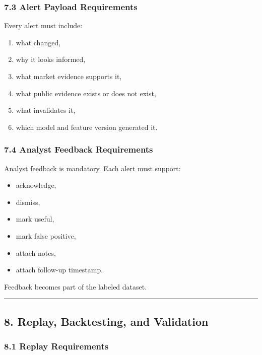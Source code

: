\documentclass[
]{article}
\providecommand{\tightlist}{%
  \setlength{\itemsep}{0pt}\setlength{\parskip}{0pt}}
\begin{document}
\subsubsection{7.3 Alert Payload
Requirements}\label{73-alert-payload-requirements}

Every alert must include:

\begin{enumerate}
\def\labelenumi{\arabic{enumi}.}
\tightlist
\item
  what changed,
\item
  why it looks informed,
\item
  what market evidence supports it,
\item
  what public evidence exists or does not exist,
\item
  what invalidates it,
\item
  which model and feature version generated it.
\end{enumerate}

\subsubsection{7.4 Analyst Feedback
Requirements}\label{74-analyst-feedback-requirements}

Analyst feedback is mandatory. Each alert must support:

\begin{itemize}
\tightlist
\item
  acknowledge,
\item
  dismiss,
\item
  mark useful,
\item
  mark false positive,
\item
  attach notes,
\item
  attach follow-up timestamp.
\end{itemize}

Feedback becomes part of the labeled dataset.

\begin{center}\rule{0.5\linewidth}{0.5pt}\end{center}

\subsection{8. Replay, Backtesting, and
Validation}\label{8-replay-backtesting-and-validation}

\subsubsection{8.1 Replay Requirements}\label{81-replay-requirements}
\end{document}
